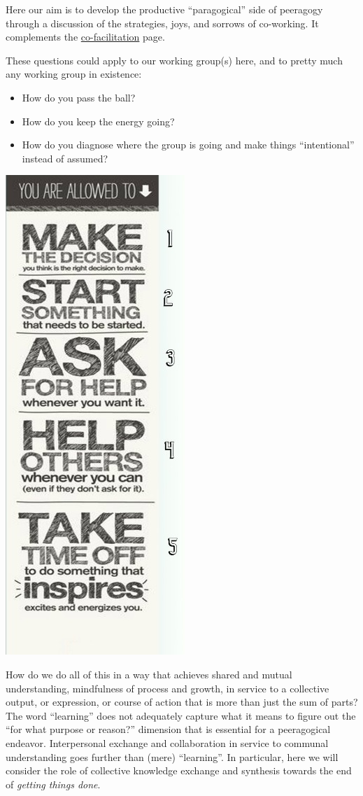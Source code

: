 Here our aim is to develop the productive ``paragogical'' side of
peeragogy through a discussion of the strategies, joys, and sorrows of
co-working. It complements the
\href{http://socialmediaclassroom.com/host/peeragogy/freelinking/Co-Working}{co-facilitation}
page.

These questions could apply to our working group(s) here, and to pretty
much any working group in existence:

\begin{itemize}
\item
  How do you pass the ball?
\item
  How do you keep the energy going?
\item
  How do you diagnose where the group is going and make things
  ``intentional'' instead of assumed?
\end{itemize}

\begin{table}
\vspace{-30pt}
\begin{center}
\includegraphics[width=.34\textwidth]{../pictures/allowed-list.jpg}
\end{center}
\vspace{-60pt}
\end{table}
How do we do all of this in a way that achieves shared and mutual
understanding, mindfulness of process and growth, in service to a
collective output, or expression, or course of action that is more than
just the sum of parts? The word ``learning'' does not adequately capture
what it means to figure out the ``for what purpose or reason?''
dimension that is essential for a peeragogical endeavor. Interpersonal
exchange and collaboration in service to communal understanding goes
further than (mere) ``learning''. In particular, here we will consider
the role of collective knowledge exchange and synthesis towards the end
of \emph{getting things done}.

